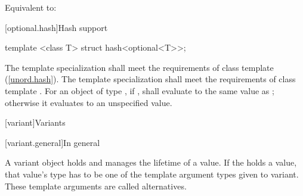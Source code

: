\begin{itemdescr}
\pnum
\effects Equivalent to: 
\end{itemdescr}

[optional.hash]{Hash support}

%
\begin{itemdecl}
template <class T> struct hash<optional<T>>;
\end{itemdecl}

\begin{itemdescr}
\pnum
\requires
The template specialization  shall meet the requirements of class template  (\ref{unord.hash}).
The template specialization  shall meet the requirements of class template .
For an object  of type , if ,
 shall evaluate to the same value as ;
otherwise it evaluates to an unspecified value.
\end{itemdescr}


[variant]{Variants}

[variant.general]{In general}

\pnum
A variant object holds and manages the lifetime of a value.
If the  holds a value, that value's type has to be one
of the template argument types given to variant.
These template arguments are called alternatives.

%

